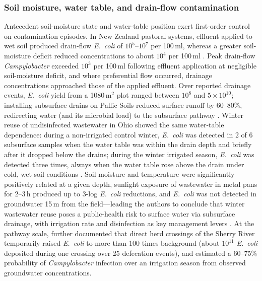 \documentclass[11pt]{article}
\begin{document}
\subsubsection{Soil moisture, water table, and drain-flow contamination}
Antecedent soil-moisture state and water-table position exert first-order control on contamination episodes. In New Zealand pastoral systems, effluent applied to wet soil produced drain-flow \textit{E.\ coli} of $10^{5}$--$10^{7}$ per 100\,ml, whereas a greater soil-moisture deficit reduced concentrations to about $10^{4}$ per 100\,ml \parencite{Collins2007}. Peak drain-flow \textit{Campylobacter} exceeded $10^{3}$ per 100\,ml following effluent application at negligible soil-moisture deficit, and where preferential flow occurred, drainage concentrations approached those of the applied effluent. Over reported drainage events, \textit{E.\ coli} yield from a 1080\,m$^{2}$ plot ranged between $10^{8}$ and $5\times10^{10}$; installing subsurface drains on Pallic Soils reduced surface runoff by 60--80\%, redirecting water (and its microbial load) to the subsurface pathway \parencite{Collins2007}. Winter reuse of undisinfected wastewater in Ohio showed the same water-table dependence: during a non-irrigated control winter, \textit{E.\ coli} was detected in 2 of 6 subsurface samples when the water table was within the drain depth and briefly after it dropped below the drains; during the winter irrigated season, \textit{E.\ coli} was detected three times, always when the water table rose above the drain under cold, wet soil conditions \parencite{Ding2021}. Soil moisture and temperature were significantly positively related at a given depth, sunlight exposure of wastewater in metal pans for 2--3\,h produced up to 3-log \textit{E.\ coli} reductions, and \textit{E.\ coli} was not detected in groundwater 15\,m from the field---leading the authors to conclude that winter wastewater reuse poses a public-health risk to surface water via subsurface drainage, with irrigation rate and disinfection as key management levers \parencite{Ding2021}. At the pathway scale, \textcite{Collins2007} further documented that direct herd crossings of the Sherry River temporarily raised \textit{E.\ coli} to more than 100 times background (about $10^{11}$ \textit{E.\ coli} deposited during one crossing over 25 defecation events), and estimated a 60--75\% probability of \textit{Campylobacter} infection over an irrigation season from observed groundwater concentrations.
\end{document}
